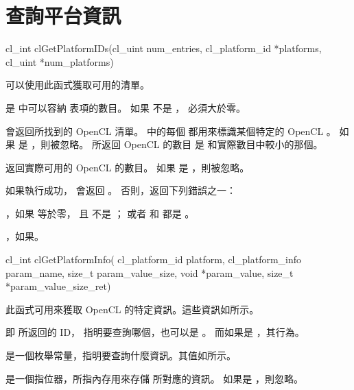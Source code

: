 \section{查詢平台資訊}


\startCLFUNC
cl_int clGetPlatformIDs(cl_uint num_entries,
			cl_platform_id *platforms,
			cl_uint *num_platforms)
\stopCLFUNC

可以使用此函式獲取可用的清單。

 是  中可以容納  表項的數目。
如果  不是 ，  必須大於零。

 會返回所找到的 OpenCL  清單。
 中的每個 
都用來標識某個特定的 OpenCL 。
如果  是 ，則被忽略。
所返回 OpenCL  的數目 是  和實際數目中較小的那個。

 返回實際可用的 OpenCL  的數目。
如果  是 ，則被忽略。

如果執行成功， 會返回 。
否則，返回下列錯誤之一：
\startigBase
\item {}，如果  等於零，
且  不是 ；
或者  和  都是 。

\item {}，如果\schostfailres。
\stopigBase


\startCLFUNC
cl_int clGetPlatformInfo(
		cl_platform_id platform,
		cl_platform_info param_name,
		size_t param_value_size,
		void *param_value,
		size_t *param_value_size_ret)
\stopCLFUNC

此函式可用來獲取 OpenCL 的特定資訊。這些資訊如所示。

 即  所返回的 ID，
指明要查詢哪個，也可以是 。
而如果是 ，其行為。

 是一個枚舉常量，指明要查詢什麼資訊。其值如所示。

 是一個指位器，所指內存用來存儲  所對應的資訊。
如果是 ，則忽略。

